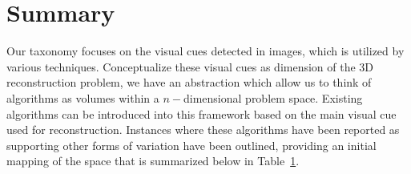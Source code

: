 \section{Summary}
Our taxonomy focuses on the visual cues detected in images, which is utilized by various techniques. Conceptualize these visual cues as dimension of the 3D reconstruction problem, we have an abstraction which allow us to think of algorithms as volumes within a $n-$dimensional problem space. Existing algorithms can be introduced into this framework based on the main visual cue used for reconstruction. Instances where these algorithms have been reported as supporting other forms of variation have been outlined, providing an initial mapping of the space that is summarized below in Table~\ref{}.